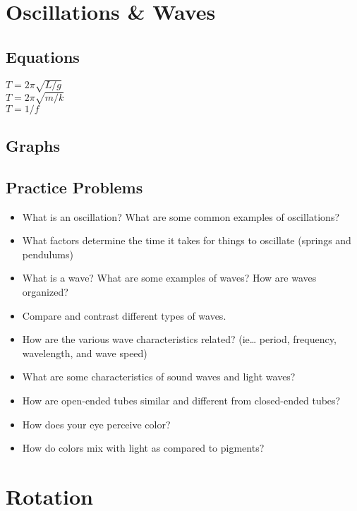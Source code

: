 \documentclass[11pt]{article}
\begin{document}
\section*{Oscillations \& Waves}
\label{sec:org90907f7}
\subsection*{Equations}
\label{sec:org4ebd0ef}
\(T=2\pi\sqrt{L/g}\) \\
\(T=2\pi\sqrt{m/k}\) \\
\(T=1/f\) \\
\subsection*{Graphs}
\label{sec:org7ff4999}
\subsection*{Practice Problems}
\label{sec:org319c62f}
\begin{itemize}
\item What is an oscillation?  What are some common examples of oscillations?
\item What factors determine the time it takes for things to oscillate (springs and pendulums)
\item What is a wave?  What are some examples of waves?  How are waves organized?
\item Compare and contrast different types of waves.
\item How are the various wave characteristics related?  (ie… period, frequency, wavelength, and wave speed)
\item What are some characteristics of sound waves and light waves?
\item How are open-ended tubes similar and different from closed-ended tubes?
\item How does your eye perceive color?
\item How do colors mix with light as compared to pigments?
\end{itemize}
\section*{Rotation}
\label{sec:orgb5a4325}
\end{document}
